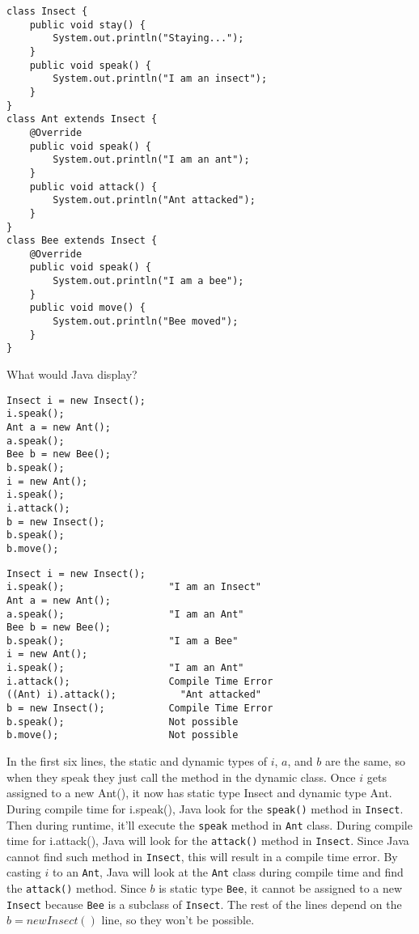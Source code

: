 \begin{blocksection}
\question
\begin{lstlisting}
class Insect {
    public void stay() {
        System.out.println("Staying...");
    }
    public void speak() {
        System.out.println("I am an insect");
    }
}
class Ant extends Insect {
    @Override
    public void speak() {
        System.out.println("I am an ant");
    }
    public void attack() {
        System.out.println("Ant attacked");
    }
}
class Bee extends Insect {
    @Override
    public void speak() {
        System.out.println("I am a bee");
    }
    public void move() {
        System.out.println("Bee moved");
    }
}
\end{lstlisting}

What would Java display?

\begin{verbatim}
Insect i = new Insect();
i.speak();
Ant a = new Ant();
a.speak();
Bee b = new Bee();
b.speak();
i = new Ant();
i.speak();
i.attack();
b = new Insect();
b.speak();
b.move();
\end{verbatim}

\newpage

\begin{solution}
\begin{verbatim}
Insect i = new Insect();
i.speak();                  "I am an Insect"
Ant a = new Ant();
a.speak();                  "I am an Ant"
Bee b = new Bee();
b.speak();                  "I am a Bee"
i = new Ant();
i.speak();                  "I am an Ant"
i.attack();                 Compile Time Error
((Ant) i).attack();           "Ant attacked"
b = new Insect();           Compile Time Error
b.speak();                  Not possible
b.move();                   Not possible
\end{verbatim}

In the first six lines, the static and dynamic types of $i$, $a$, and $b$ are the same, so when they speak they just call the method in the dynamic class.  Once $i$ gets assigned to a new Ant(), it now has static type Insect and dynamic type Ant.  During compile time for i.speak(), Java look for the \lstinline$speak()$ method in \lstinline$Insect$.  Then during runtime, it'll execute the \lstinline$speak$ method in \lstinline$Ant$ class.  During compile time for i.attack(), Java will look for the \lstinline$attack()$ method in \lstinline$Insect$.  Since Java cannot find such method in \lstinline$Insect$, this will result in a compile time error.  By casting $i$ to an \lstinline$Ant$, Java will look at the \lstinline$Ant$ class during compile time and find the \lstinline$attack()$ method. Since $b$ is static type \lstinline$Bee$, it cannot be assigned to a new \lstinline$Insect$ because \lstinline$Bee$ is a subclass of \lstinline$Insect$.  The rest of the lines depend on the $b = new Insect()$ line, so they won't be possible.
\end{solution}
\end{blocksection}

